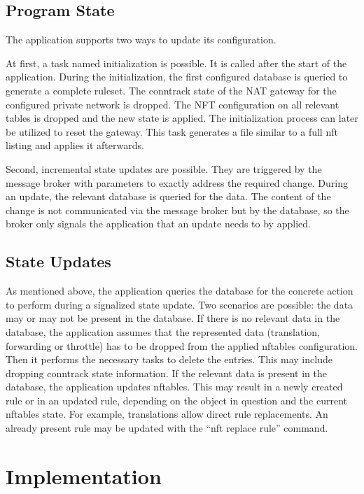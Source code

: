 \documentclass{report}
\begin{document}
\section{Program State}\label{program-state}

The application supports two ways to update its configuration.

At first, a task named initialization is possible. It is called after
the start of the application. During the initialization, the first
configured database is queried to generate a complete ruleset. The
conntrack state of the NAT gateway for the configured private network is
dropped. The NFT configuration on all relevant tables is dropped and the
new state is applied. The initialization process can later be utilized
to reset the gateway. This task generates a file similar to a full nft
listing and applies it afterwards.

Second, incremental state updates are possible. They are triggered by
the message broker with parameters to exactly address the required
change. During an update, the relevant database is queried for the data.
The content of the change is not communicated via the message broker but
by the database, so the broker only signals the application that an
update needs to by applied.

\section{State Updates}\label{state-updates}

As mentioned above, the application queries the database for the
concrete action to perform during a signalized state update. Two
scenarios are possible: the data may or may not be present in the
database. If there is no relevant data in the database, the application
assumes that the represented data (translation, forwarding or throttle)
has to be dropped from the applied nftables configuration. Then it
performs the necessary tasks to delete the entries. This may include
dropping conntrack state information. If the relevant data is present in
the database, the application updates nftables. This may result in a
newly created rule or in an updated rule, depending on the object in
question and the current nftables state. For example, translations allow
direct rule replacements. An already present rule may be updated with
the ``nft replace rule'' command.

\chapter{Implementation}\label{implementation}
\end{document}
